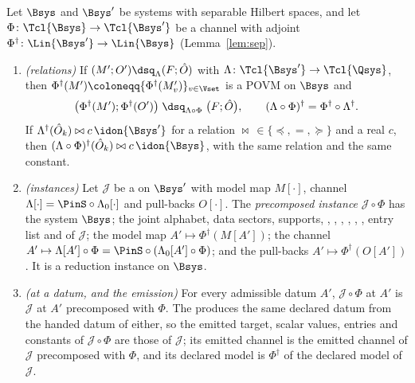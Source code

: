 \begin{lemma}\label{lem:precomposed-instance}
Let $\Bsys$ and $\Bsys'$ be systems with separable Hilbert spaces, and let
$\Phi\colon\Tcl{\Bsys}\to\Tcl{\Bsys'}$ be a channel with adjoint
$\Phi^{\dagger}\colon\Lin{\Bsys'}\to\Lin{\Bsys}$ (Lemma~\ref{lem:sep}).
\begin{enumerate}[label=(\roman*),leftmargin=3.0em]
\item \emph{(relations)} If $(M';O')\dsq_{\Lambda}(F;\hat O)$ with
  $\Lambda\colon\Tcl{\Bsys'}\to\Tcl{\Qsys}$, then
  $\Phi^{\dagger}(M')\coloneqq\{\Phi^{\dagger}(M'_v)\}_{v\in\Vset}$ is a POVM
  on $\Bsys$ and
  \begin{equation}\label{eq:precomposed-relation}
    \big(\Phi^{\dagger}(M');\Phi^{\dagger}(O')\big)\;\dsq_{\Lambda\circ\Phi}\;
    \big(F;\hat O\big),\qquad
    (\Lambda\circ\Phi)^{\dagger}=\Phi^{\dagger}\circ\Lambda^{\dagger}.
  \end{equation}
  If $\Lambda^{\dagger}(\hat O_k)\bowtie c\,\idon{\Bsys'}$ for a relation
  $\bowtie\,\in\{\preceq,=,\succeq\}$ and a real $c$, then
  $(\Lambda\circ\Phi)^{\dagger}(\hat O_k)\bowtie c\,\idon{\Bsys}$, with the
  same relation and the same constant.
\item \emph{(instances)} Let $\mathcal{J}$ be a  on
  $\Bsys'$ with model map $M[\cdot]$, channel
  $\Lambda[\cdot]=\PinS\circ\Lambda_0[\cdot]$ and pull-backs $O[\cdot]$.
  The \emph{precomposed instance} $\mathcal{J}\circ\Phi$ has the system
  $\Bsys$; the joint alphabet, data sectors, supports,
  , , ,
  , , , entry list and
   of $\mathcal{J}$; the model map
  $A'\mapsto\Phi^{\dagger}(M[A'])$; the channel
  $A'\mapsto\Lambda[A']\circ\Phi=\PinS\circ(\Lambda_0[A']\circ\Phi)$; and the
  pull-backs $A'\mapsto\Phi^{\dagger}(O[A'])$. It is a reduction instance
  on $\Bsys$.
\item \emph{(at a datum, and the emission)} For every admissible datum $A'$,
  $\mathcal{J}\circ\Phi$ at $A'$ is $\mathcal{J}$ at $A'$ precomposed with
  $\Phi$. The  produces the same declared datum from
  the handed datum of either, so the emitted target, scalar values, entries
  and constants of $\mathcal{J}\circ\Phi$ are those of $\mathcal{J}$; its
  emitted channel is the emitted channel of $\mathcal{J}$ precomposed with
  $\Phi$, and its declared model is $\Phi^{\dagger}$ of the declared model of
  $\mathcal{J}$.
\end{enumerate}
\end{lemma}

